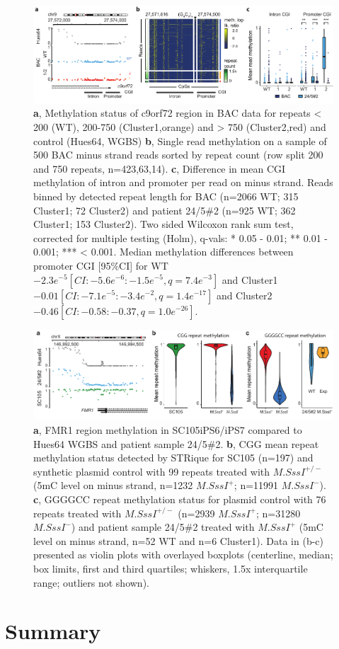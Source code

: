 \begin{figure}[h]
    \centering
    \includegraphics[width=1.0\textwidth]{figures/strique/methylation_bac_region.pdf}
    \captionsetup{format=plain}
    \caption[Nanopore single read methylation in BAC data]{\textbf{a}, Methylation status of c9orf72 region in BAC data for repeats < 200 (WT), 200-750 (Cluster1,orange) and > 750 (Cluster2,red) and control (Hues64, WGBS) \textbf{b}, Single read methylation on a sample of 500 BAC minus strand reads sorted by repeat count (row split 200 and 750 repeats, n=423,63,14). \textbf{c}, Difference in mean CGI methylation of intron and promoter per read on minus strand. Reads binned by detected repeat length for BAC (n=2066 WT; 315 Cluster1; 72 Cluster2) and patient 24/5\#2 (n=925 WT; 362 Cluster1; 153 Cluster2). Two sided Wilcoxon rank sum test, corrected for multiple testing (Holm), q-vals: * 0.05 - 0.01; ** 0.01 - 0.001; *** < 0.001. Median methylation differences between promoter CGI [95\%CI] for WT $-2.3e^{-5} [CI: -5.6e^{-6}:-1.5e^{-5}, q=7.4e^{-3}] $ and Cluster1 $ -0.01 [CI: -7.1e^{-5}:-3.4e^{-2}, q=1.4e^{-17}] $ and Cluster2 $ -0.46 [CI: -0.58:-0.37, q=1.0e^{-26}] $.}
    \label{fig:strique:methylation_bac_region}
\end{figure}

\begin{figure}[h]
    \centering
    \includegraphics[width=1.0\textwidth]{figures/strique/methylation_repeat.pdf}
    \captionsetup{format=plain}
    \caption[Region and repeat methylation detection]{\textbf{a}, FMR1 region methylation in SC105iPS6/iPS7 compared to Hues64 WGBS and patient sample 24/5\#2. \textbf{b}, CGG mean repeat methylation status detected by STRique for SC105 (n=197) and synthetic plasmid control with 99 repeats treated with $ M.SssI^{+/-} $ (5mC level on minus strand, n=1232 $ M.SssI^{+} $; n=11991 $ M.SssI^{-} $). \textbf{c}, GGGGCC repeat methylation status for plasmid control with 76 repeats treated with $ M.SssI^{+/-} $ (n=2939 $ M.SssI^{+} $; n=31280 $ M.SssI^{-} $) and patient sample 24/5\#2 treated with $ M.SssI^{+} $ (5mC level on minus strand, n=52 WT and n=6 Cluster1). Data in (b-c) presented as violin plots with overlayed boxplots (centerline, median; box limits, first and third quartiles; whiskers, 1.5x interquartile range; outliers not shown).}
    \label{fig:strique:methylation_repeat}
\end{figure}




\section{Summary}
\label{sec:strique:summary}




